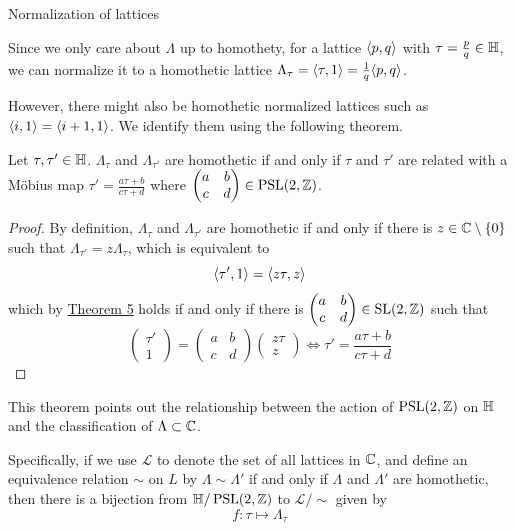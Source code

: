 \begin{hyperbolicbox}{Normalization of lattices}
    \small
    \begin{defi}
        Since we only care about $\Lambda$ up to homothety, for a lattice $\langle p,q\rangle$ with $\tau=\frac{p}{q}\in\mathbb{H}$, we can normalize it to a homothetic lattice $\Lambda_{\tau}=\langle\tau,1\rangle=\frac{1}{q}\langle p,q\rangle$. \cite{silvermanAT} 
    \end{defi}
    
    However, there might also be homothetic normalized lattices such as $\langle i,1\rangle=\langle i+1,1\rangle$. We identify them using the following theorem.

    \begin{thm}
        Let $\tau,\tau'\in\mathbb{H}$. $\Lambda_\tau$ and $\Lambda_{\tau'}$ are homothetic if and only if $\tau$ and $\tau'$ are related with a M\"obius map $\tau'=\frac{a\tau+b}{c\tau+d}$ where $\begin{pmatrix}
            a&b\\c&d
        \end{pmatrix}\in\operatorname{PSL}(2,\mathbb{Z})$.
    \end{thm}
    \begin{proof}
        By definition, $\Lambda_\tau$ and $\Lambda_{\tau'}$ are homothetic if and only if there is $z\in\mathbb{C}\setminus\left\{0\right\}$ such that $\Lambda_{\tau'}=z\Lambda_\tau$, which is equivalent to
        $$
        \langle\tau',1\rangle=\langle z\tau,z\rangle
        $$
        which by \hyperref[thm5]{Theorem 5} holds if and only if there is $\begin{pmatrix}
            a&b\\c&d
        \end{pmatrix}\in\operatorname{SL}(2,\mathbb{Z})$ such that
        $$
        \begin{pmatrix}
            \tau'\\1
        \end{pmatrix}=\begin{pmatrix}
            a&b\\c&d
        \end{pmatrix}\begin{pmatrix}
            z\tau\\z
        \end{pmatrix}\iff \tau'=\frac{a\tau+b}{c\tau+d}
        $$
    \end{proof}

    This theorem points out the relationship between the action of $\operatorname{PSL}(2,\mathbb{Z})$ on $\mathbb{H}$ and the classification of $\Lambda\subset\mathbb{C}$.
    
    Specifically, if we use $\mathcal{L}$ to denote the set of all lattices in $\mathbb{C}$, and define an equivalence relation $\sim$ on $L$ by $\Lambda\sim\Lambda'$ if and only if $\Lambda$ and $\Lambda'$ are homothetic, then there is a bijection from $\mathbb{H}/\operatorname{PSL}(2,\mathbb{Z})$ to $\mathcal{L}/\sim$ given by
    $$
        f:\tau\mapsto\Lambda_\tau
    $$
\end{hyperbolicbox}